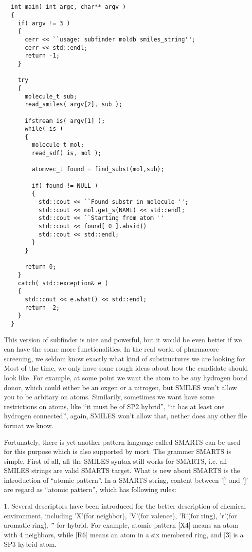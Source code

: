 \documentclass[letterpaper]{book}
\begin{document}
\begin{lstlisting}


  int main( int argc, char** argv )
  {
    if( argv != 3 )
    {
      cerr << ``usage: subfinder moldb smiles_string'';
      cerr << std::endl;
      return -1;
    }

    try
    {
      molecule_t sub;
      read_smiles( argv[2], sub );

      ifstream is( argv[1] );
      while( is )
      {
        molecule_t mol;
        read_sdf( is, mol );
                
        atomvec_t found = find_subst(mol,sub);

        if( found != NULL )
        {
          std::cout << ``Found substr in molecule '';
          std::cout << mol.get_s(NAME) << std::endl;
          std::cout << ``Starting from atom '' 
          std::cout << found[ 0 ].absid() 
          std::cout << std::endl; 
        }
      }
      
      return 0;
    }
    catch( std::exception& e )
    {
      std::cout << e.what() << std::endl;
      return -2;
    }
  }

\end{lstlisting}

This version of subfinder is nice and powerful, but it would be even better if we can have the
some more functionalities. In the real world of pharmacore screening, we seldom know
exactly what kind of substructures we are looking for. Most of the time, we only have some rough
ideas about how the candidate should look like. For example, at some point we want the atom to be any hydrogen
bond donor, which could either be an oxgen or a nitrogen, but SMILES won't allow you to be 
arbitary on atoms. Similarily, sometimes we want have some restrictions on atoms, like 
``it must be of SP2 hybrid'', ``it has at least one hydrogen connected'', again, SMILES won't 
allow that, nether does any other file format we know.

Fortunately, there is yet another pattern language called SMARTS can be used for this purpose which
is also supported by mort. The grammer SMARTS is simple. First of all, all the SMILES syntax 
still works for SMARTS, i.e. all SMILES strings are valid SMARTS target. What is new about 
SMARTS is the introduction of ``atomic pattern''. In a SMARTS string, content between '[' and 
']' are regard as ``atomic pattern'', which has following rules:


1. Several descriptors have been introduced for the better description of chemical environment,
including 'X'(for neighbor), 'V'(for valence), 'R'(for ring), 'r'(for aromatic ring), '\^' for
hybrid. For example, atomic pattern [X4] means an atom with 4 neighbors, while [R6] means an 
atom in a six membered ring, and [\^3] is a SP3 hybrid atom.
\end{document}
